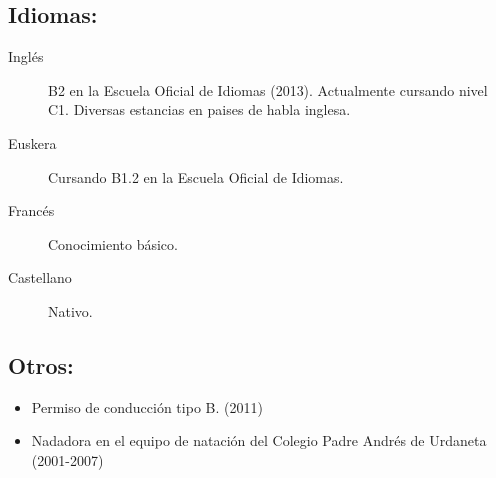 \documentclass[10pt,a4paper,notitlepage]{article}
\begin{document}
\subsection*{Idiomas:}
\begin{description}
  \item [Inglés] B2 en la Escuela Oficial de Idiomas (2013). Actualmente cursando nivel C1. Diversas estancias en paises de habla inglesa.
  \item [Euskera] Cursando B1.2 en la Escuela Oficial de Idiomas.
  \item [Francés] Conocimiento básico.
  \item [Castellano] Nativo.
\end{description}

\subsection*{Otros:}
\begin{itemize}
\item Permiso de conducción tipo B. (2011)
\item Nadadora en el equipo de natación del Colegio Padre Andrés de Urdaneta (2001-2007)
\end{itemize}
\end{document}
